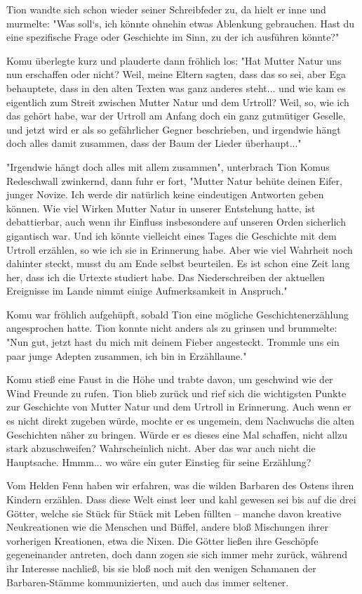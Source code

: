 Tion wandte sich schon wieder seiner Schreibfeder zu, da hielt er inne und murmelte: "Was soll‘s, ich könnte ohnehin etwas Ablenkung gebrauchen. Hast du eine spezifische Frage oder Geschichte im Sinn, zu der ich ausführen könnte?"

Komu überlegte kurz und plauderte dann fröhlich los: "Hat Mutter Natur uns nun erschaffen oder nicht? Weil, meine Eltern sagten, dass das so sei, aber Ega behauptete, dass in den alten Texten was ganz anderes steht... und wie kam es eigentlich zum Streit zwischen Mutter Natur und dem Urtroll? Weil, so, wie ich das gehört habe, war der Urtroll am Anfang doch ein ganz gutmütiger Geselle, und jetzt wird er als so gefährlicher Gegner beschrieben, und irgendwie hängt doch alles damit zusammen, dass der Baum der Lieder überhaupt..."

"Irgendwie hängt doch alles mit allem zusammen", unterbrach Tion Komus Redeschwall zwinkernd, dann fuhr er fort, "Mutter Natur behüte deinen Eifer, junger Novize. Ich werde dir natürlich keine eindeutigen Antworten geben können. Wie viel Wirken Mutter Natur in unserer Entstehung hatte, ist debattierbar, auch wenn ihr Einfluss insbesondere auf unseren Orden sicherlich gigantisch war. Und ich könnte vielleicht eines Tages die Geschichte mit dem Urtroll erzählen, so wie ich sie in Erinnerung habe. Aber wie viel Wahrheit noch dahinter steckt, musst du am Ende selbst beurteilen. Es ist schon eine Zeit lang her, dass ich die Urtexte studiert habe. Das Niederschreiben der aktuellen Ereignisse im Lande nimmt einige Aufmerksamkeit in Anspruch."

Komu war fröhlich aufgehüpft, sobald Tion eine mögliche Geschichtenerzählung angesprochen hatte. Tion konnte nicht anders als zu grinsen und brummelte: "Nun gut, jetzt hast du mich mit deinem Fieber angesteckt. Trommle uns ein paar junge Adepten zusammen, ich bin in Erzähllaune."

Komu stieß eine Faust in die Höhe und trabte davon, um geschwind wie der Wind Freunde zu rufen. Tion blieb zurück und rief sich die wichtigsten Punkte zur Geschichte von Mutter Natur und dem Urtroll in Erinnerung. Auch wenn er es nicht direkt zugeben würde, mochte er es ungemein, dem Nachwuchs die alten Geschichten näher zu bringen. Würde er es dieses eine Mal schaffen, nicht allzu stark abzuschweifen? Wahrscheinlich nicht. Aber das war auch nicht die Hauptsache. Hmmm... wo wäre ein guter Einstieg für seine Erzählung?

\trennzeichen

Vom Helden Fenn haben wir erfahren, was die wilden Barbaren des Ostens ihren Kindern erzählen. Dass diese Welt einst leer und kahl gewesen sei bis auf die drei Götter, welche sie Stück für Stück mit Leben füllten – manche davon kreative Neukreationen wie die Menschen und Büffel, andere bloß Mischungen ihrer vorherigen Kreationen, etwa die Nixen. Die Götter ließen ihre Geschöpfe gegeneinander antreten, doch dann zogen sie sich immer mehr zurück, während ihr Interesse nachließ, bis sie bloß noch mit den wenigen Schamanen der Barbaren-Stämme kommunizierten, und auch das immer seltener.

